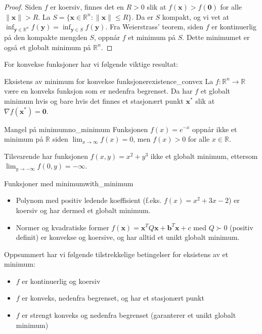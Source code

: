 \begin{proof}
	Siden $f$ er koersiv, finnes det en $R > 0$ slik at $f(\symbf{x}) > f(\symbf{0})$ for alle $\|\symbf{x}\| > R$. La $S = \{\symbf{x} \in \mathbb{R}^n : \|\symbf{x}\| \leq R\}$. Da er $S$ kompakt, og vi vet at $\inf_{\symbf{y} \in \mathbb{R}^n} f(\symbf{y}) = \inf_{\symbf{y} \in S} f(\symbf{y})$. Fra Weierstrass' teorem, siden $f$ er kontinuerlig på den kompakte mengden $S$, oppnår $f$ et minimum på $S$. Dette minimumet er også et globalt minimum på $\mathbb{R}^n$.
\end{proof}

For konvekse funksjoner har vi følgende viktige resultat:

\begin{proposition}{Eksistens av minimum for konvekse funksjoner}{existence_convex}
	La $f: \mathbb{R}^n \to \mathbb{R}$ være en konveks funksjon som er nedenfra begrenset. Da har $f$ et globalt minimum hvis og bare hvis det finnes et stasjonært punkt $\symbf{x}^*$ slik at $\nabla f(\symbf{x}^*) = \symbf{0}$.
\end{proposition}

\begin{example}{Mangel på minimum}{no_minimum}
	Funksjonen $f(x) = e^{-x}$ oppnår ikke et minimum på $\mathbb{R}$ siden $\lim_{x \to \infty} f(x) = 0$, men $f(x) > 0$ for alle $x \in \mathbb{R}$.

	Tilsvarende har funksjonen $f(x, y) = x^2 + y^3$ ikke et globalt minimum, ettersom $\lim_{y \to -\infty} f(0, y) = -\infty$.
\end{example}

\begin{example}{Funksjoner med minimum}{with_minimum}
	\begin{itemize}
		\item Polynom med positiv ledende koeffisient (f.eks. $f(x) = x^2 + 3x - 2$) er koersiv og har dermed et globalt minimum.
		\item Normer og kvadratiske former $f(\symbf{x}) = \symbf{x}^T Q \symbf{x} + \symbf{b}^T \symbf{x} + c$ med $Q \succ 0$ (positiv definit) er konvekse og koersive, og har alltid et unikt globalt minimum.
	\end{itemize}
\end{example}

Oppsummert har vi følgende tilstrekkelige betingelser for eksistens av et minimum:
\begin{itemize}
	\item $f$ er kontinuerlig og koersiv
	\item $f$ er konveks, nedenfra begrenset, og har et stasjonært punkt
	\item $f$ er strengt konveks og nedenfra begrenset (garanterer et unikt globalt minimum)
\end{itemize}

